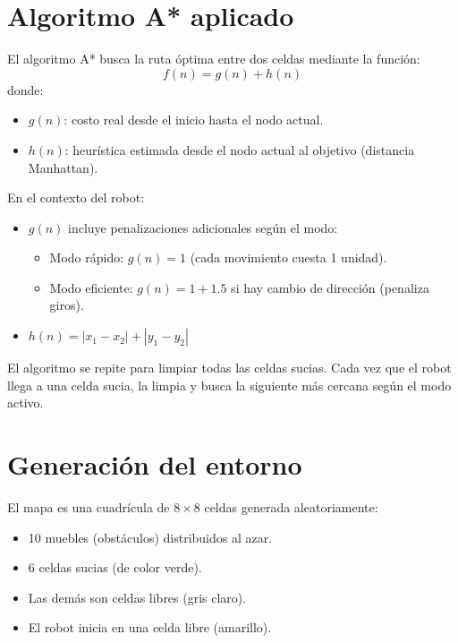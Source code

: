 \documentclass[12pt,a4paper]{article}
\begin{document}
\section{Algoritmo A* aplicado}

El algoritmo A* busca la ruta óptima entre dos celdas mediante la función:
\[
f(n) = g(n) + h(n)
\]
donde:
\begin{itemize}
    \item \( g(n) \): costo real desde el inicio hasta el nodo actual.
    \item \( h(n) \): heurística estimada desde el nodo actual al objetivo (distancia Manhattan).
\end{itemize}

En el contexto del robot:
\begin{itemize}
    \item \( g(n) \) incluye penalizaciones adicionales según el modo:
    \begin{itemize}
        \item Modo rápido: \( g(n) = 1 \) (cada movimiento cuesta 1 unidad).
        \item Modo eficiente: \( g(n) = 1 + 1.5 \) si hay cambio de dirección (penaliza giros).
    \end{itemize}
    \item \( h(n) = |x_1 - x_2| + |y_1 - y_2| \)
\end{itemize}

El algoritmo se repite para limpiar todas las celdas sucias. Cada vez que el robot llega a una celda sucia, la limpia y busca la siguiente más cercana según el modo activo.

\section{Generación del entorno}

El mapa es una cuadrícula de $8\times8$ celdas generada aleatoriamente:
\begin{itemize}
    \item 10 muebles (obstáculos) distribuidos al azar.
    \item 6 celdas sucias (de color verde).
    \item Las demás son celdas libres (gris claro).
    \item El robot inicia en una celda libre (amarillo).
\end{itemize}
\end{document}
